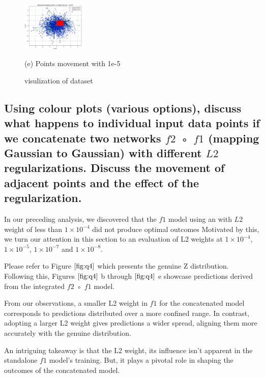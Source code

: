 \documentclass{article}
\begin{document}
\begin{figure}[htb]
  \hfill
  \begin{minipage}[b]{0.48\linewidth}
    \centering
    \centerline{\includegraphics[width=3.0cm]{images/q3_1e-5}}
    \centerline{(e) Points movement with 1e-5}\medskip
  \end{minipage}
  \caption{visulization of dataset}
  \label{fig:q3}
  \end{figure}

\subsection{Using colour plots (various options), discuss what happens to individual
input data points if we concatenate two networks $f2$ ◦ $f1$ (mapping
Gaussian to Gaussian) with different $L2$ regularizations. Discuss the
movement of adjacent points and the effect of the regularization.}
\label{ssec:q4}

In our preceding analysis, we discovered that the $f1$
model using an with $L2$ weight of less than $1\times10^{-4}$ did not produce optimal outcomes
Motivated by this, we turn our attention in this section to an evaluation of L2 weights at
 $1\times10^{-4}$, $1\times10^{-5}$, $1\times10^{-7}$ and $1\times10^{-8}$.

Please refer to Figure $\ref{fig:q4}$ which presents the genuine Z distribution. 
Following this, Figures $\ref{fig:q4}$ b through $\ref{fig:q4}$ e 
showcase predictions derived from the integrated $f2$ ◦ $f1$ model.

From our observations, a smaller L2 weight in $f1$ 
for the concatenated model corresponds to predictions distributed over a more confined range.
In contrast, adopting a larger L2 weight gives predictions a wider spread, aligning them more accurately with the genuine distribution.

An intriguing takeaway is that the L2 weight, 
its influence isn't apparent in the standalone $f1$ model's training. 
But, it plays a pivotal role in shaping the outcomes of the concatenated model.
\end{document}
